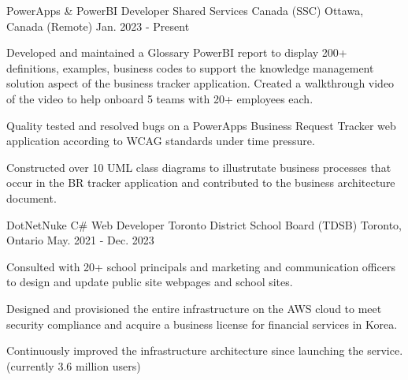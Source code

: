 

\begin{cventries}

  \cventry
    {PowerApps \& PowerBI Developer} %
    {Shared Services Canada (SSC)} %
    {Ottawa, Canada (Remote)} %
    {Jan. 2023 - Present} %
    {
      \begin{cvitems} %
        \item {Developed and maintained a Glossary PowerBI report to display 200+ definitions, examples, business codes to support the knowledge management solution aspect of the business tracker application. Created a walkthrough video of the video to help onboard 5 teams with 20+ employees each. }
        \item {Quality tested and resolved bugs on a PowerApps Business Request Tracker web application according to WCAG standards under time pressure.  }
        \item {Constructed over 10 UML class diagrams to illustrutate business processes that occur in the BR tracker application and contributed to the business architecture document.}
      \end{cvitems}
    }

\cventry
    {DotNetNuke C\# Web Developer} %
    {Toronto District School Board (TDSB)} %
    {Toronto, Ontario} %
    {May. 2021 - Dec. 2023} %
    {
      \begin{cvitems} %
        \item {Consulted with 20+ school principals and marketing and communication officers to design and update public site webpages and school sites.  }
        \item {Designed and provisioned the entire infrastructure on the AWS cloud to meet security compliance and acquire a business license for financial services in Korea.}
        \item {Continuously improved the infrastructure architecture since launching the service. (currently 3.6 million users)}
      \end{cvitems}
    }


\end{cventries}

